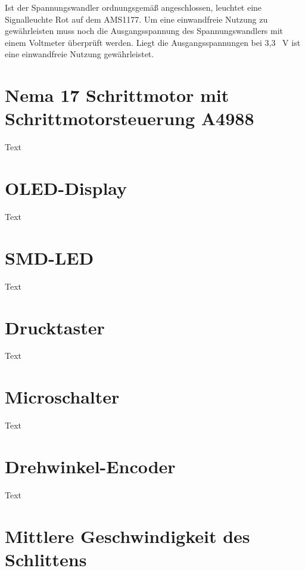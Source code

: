 Ist der Spannungswandler ordnungsgemäß angeschlossen, leuchtet eine Signalleuchte Rot auf dem AMS1177. Um eine einwandfreie Nutzung zu gewährleisten muss noch die Ausgangsspannung des Spannungswandlers mit einem Voltmeter überprüft werden. Liegt die Ausgangsspannungen bei 3,3 \ V ist eine einwandfreie Nutzung gewährleistet. 


\section{ Nema 17 Schrittmotor mit Schrittmotorsteuerung A4988 }

Text

%
%

\section{OLED-Display}

Text

%
%

\section{SMD-LED}

Text

%
%

\section{Drucktaster}

Text

%
%

\section{Microschalter}

Text

%
%

\section{Drehwinkel-Encoder}

Text

%
%



\section{Mittlere Geschwindigkeit des Schlittens}

